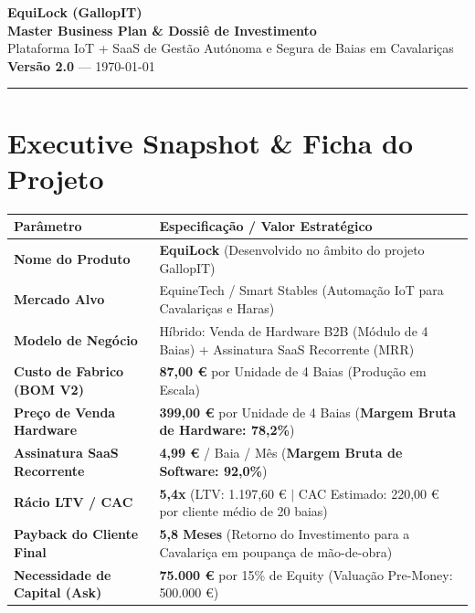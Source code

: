 \documentclass[11pt,a4paper]{article}
\begin{document}
\begin{center}
    {\Huge \bfseries \color{primary} EquiLock (GallopIT)}\\[0.3cm]
    {\Large \bfseries Master Business Plan \& Dossiê de Investimento}\\[0.2cm]
    {\color{darkgray} Plataforma IoT + SaaS de Gestão Autónoma e Segura de Baias em Cavalariças}\\[0.4cm]
    \textbf{Versão 2.0} --- \today \\
    \rule{\textwidth}{1.5pt}
\end{center}

\vspace{0.3cm}

\section{Executive Snapshot \& Ficha do Projeto}

\begin{table}[h!]
\centering
\small
\renewcommand{\arraystretch}{1.3}
\begin{tabularx}{\textwidth}{|l|X|}
\hline
\rowcolor{primary!10} \textbf{Parâmetro} & \textbf{Especificação / Valor Estratégico} \\ \hline
\textbf{Nome do Produto} & \textbf{EquiLock} (Desenvolvido no âmbito do projeto GallopIT) \\ \hline
\textbf{Mercado Alvo} & EquineTech / Smart Stables (Automação IoT para Cavalariças e Haras) \\ \hline
\textbf{Modelo de Negócio} & Híbrido: Venda de Hardware B2B (Módulo de 4 Baias) + Assinatura SaaS Recorrente (MRR) \\ \hline
\textbf{Custo de Fabrico (BOM V2)} & \textbf{87,00 €} por Unidade de 4 Baias (Produção em Escala) \\ \hline
\textbf{Preço de Venda Hardware} & \textbf{399,00 €} por Unidade de 4 Baias (\textbf{Margem Bruta de Hardware: 78,2\%}) \\ \hline
\textbf{Assinatura SaaS Recorrente} & \textbf{4,99 €} / Baia / Mês (\textbf{Margem Bruta de Software: 92,0\%}) \\ \hline
\textbf{Rácio LTV / CAC} & \textbf{5,4x} (LTV: 1.197,60 € $|$ CAC Estimado: 220,00 € por cliente médio de 20 baias) \\ \hline
\textbf{Payback do Cliente Final} & \textbf{5,8 Meses} (Retorno do Investimento para a Cavalariça em poupança de mão-de-obra) \\ \hline
\textbf{Necessidade de Capital (Ask)} & \textbf{75.000 €} por 15\% de Equity (Valuação Pre-Money: 500.000 €) \\ \hline
\end{tabularx}
\end{table}
\end{document}
